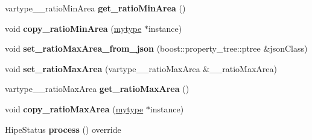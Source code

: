 \begin{DoxyCompactItemize}
vartype\+\_\+\+\_\+ratio\+Min\+Area {\bfseries get\+\_\+ratio\+Min\+Area} ()
\item 
\mbox{\label{classfilter_1_1_algos_1_1_i_d_plate_identifier_af8d7d8137d96387556174021793c4573}} 
void {\bfseries copy\+\_\+ratio\+Min\+Area} (\hyperlink{classfilter_1_1_algos_1_1_i_d_plate_identifier}{mytype} $\ast$instance)
\item 
\mbox{\label{classfilter_1_1_algos_1_1_i_d_plate_identifier_a38a1edfcc7b4441d62bb3e8bf8897586}} 
void {\bfseries set\+\_\+ratio\+Max\+Area\+\_\+from\+\_\+json} (boost\+::property\+\_\+tree\+::ptree \&json\+Class)
\item 
\mbox{\label{classfilter_1_1_algos_1_1_i_d_plate_identifier_a7d76948ef157014724acc7b5669e5c07}} 
void {\bfseries set\+\_\+ratio\+Max\+Area} (vartype\+\_\+\+\_\+ratio\+Max\+Area \&\+\_\+\+\_\+ratio\+Max\+Area)
\item 
\mbox{\label{classfilter_1_1_algos_1_1_i_d_plate_identifier_a1edee6c9b62dd712ce14a7156a7e90e8}} 
vartype\+\_\+\+\_\+ratio\+Max\+Area {\bfseries get\+\_\+ratio\+Max\+Area} ()
\item 
\mbox{\label{classfilter_1_1_algos_1_1_i_d_plate_identifier_a51e6e5eb561b2143b11444ff2006d035}} 
void {\bfseries copy\+\_\+ratio\+Max\+Area} (\hyperlink{classfilter_1_1_algos_1_1_i_d_plate_identifier}{mytype} $\ast$instance)
\item 
\mbox{\label{classfilter_1_1_algos_1_1_i_d_plate_identifier_ad48d538a3a7edef63606dec214bd3532}} 
Hipe\+Status {\bfseries process} () override
\end{DoxyCompactItemize}
